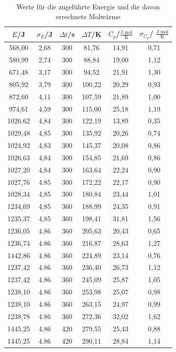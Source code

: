 \begin{table}[H]
	\begin{center}
		\begin{tabular}{c c c c c c}
			\toprule
			\(E\)/J & \(\sigma_E\)/J & \(\Delta t\)/s & \(\Delta T\)/K & \(C_p\)/\(\frac{\text{J mol}}{\text{K}}\) & \(\sigma_{C_p}\)/							\(\frac{\text{J mol}}{\text{K}}\) \\
			\midrule
			568,00	&2,68	&300	&81,76	&14,91	&0,71\\
			580,99	&2,74	&300	&88,84	&19,00	&1,12\\
			671,48	&3,17	&300	&94,52	&21,91	&1,30\\
			805,92	&3,79	&300	&100,22	&20,29	&0,93\\
			872,60	&4,11	&300	&107,59	&21,89	&1,00\\
			974,61	&4,59	&300	&115,00	&25,18	&1,19\\
			1026,62	&4,84	&300	&122,19	&13,89	&0,35\\
			1029,48	&4,85	&300	&135,92	&20,26	&0,74\\                           
			1024,92	&4,83	&300	&145,37	&20,08	&0,86\\
			1026,63	&4,84	&300	&154,85	&21,69	&0,86\\ 
			1027,20	&4,84	&300	&163,64	&22,24	&0,90\\
			1027,76	&4.85	&300	&172,22	&22,17	&0,90\\
			1028,34	&4,85	&300	&180,84	&23,44	&1,01\\
			1234,69	&4,85	&360	&188,99	&24,35	&0,91\\
			1235,37	&4,85	&360	&198,41	&31,81	&1,56\\
			1236,05	&4.86	&360	&205,63	&20,43	&0,65\\
			1236,74	&4.86	&360	&216,87	&28,63	&1,27\\                
			1442,86	&4.86	&360	&224,89	&23,14	&0,76\\                  
			1237,42	&4.86	&360	&236,40	&26,73	&1,12\\                    
			1237,42	&4.86	&360	&245,09	&25,87	&1,05\\
			1238,10	&4.86	&360	&253,98	&25,07	&0,98\\ 
			1238,10	&4.86	&360	&263,15	&24,97	&0,99\\            
			1238,78	&4.86	&360	&272,36	&32,02	&1,62\\
			1445,25	&4.86	&420	&279,55	&25,43	&0,88\\
			1445,25	&4.86	&420	&290,11	&28,84	&1,14\\
			\bottomrule
		\end{tabular}
		\caption{Werte für die zugeführte Energie und die davon errechnete Molwärme}
		\label{fig:tab2}
	\end{center}
\end{table}

